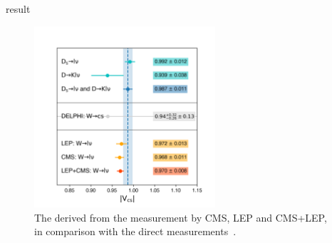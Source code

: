   
\begin{frame}{result}
    \begin{figure}[!h]
        \centering
        \includegraphics[width=0.6\textwidth]{chapters/Introduction/sectionRelatedWorks/figures/vcs.png}
        \caption{The \absVcs derived from the \BWl measurement by CMS, LEP and CMS+LEP, in comparison with the direct measurements~\cite{pdg2020}.}
        \label{fig:analysis:result:vcs}
    \end{figure}
\end{frame}


